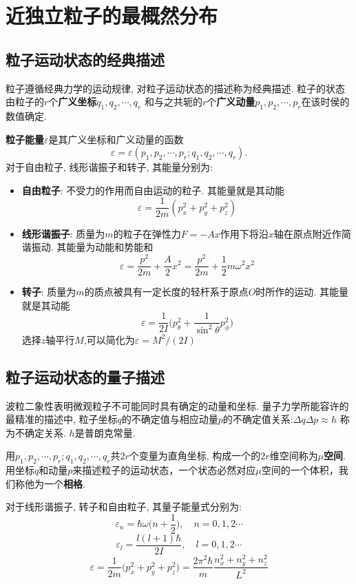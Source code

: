 \section{近独立粒子的最概然分布}


\subsection{粒子运动状态的经典描述}
粒子遵循经典力学的运动规律, 对粒子运动状态的描述称为经典描述. 粒子的状态由粒子的$r$个\textbf{广义坐标}$q_1,q_2,\cdots,q_r$ 和与之共轭的$r$个\textbf{广义动量}$p_1,p_2,\cdots,p_r$在该时侯的数值确定. 

\textbf{粒子能量}$\varepsilon$是其广义坐标和广义动量的函数
\[
\varepsilon = \varepsilon(p_1,p_2,\cdots,p_r; q_1,q_2,\cdots,q_r).
\]
对于自由粒子, 线形谐振子和转子, 其能量分别为:
\begin{itemize}
\item\textbf{自由粒子}: 不受力的作用而自由运动的粒子. 其能量就是其动能
\[
\varepsilon = \frac{1}{2m}(p_x^2 + p_y^2 + p_z^2)
\]
\item\textbf{线形谐振子}: 质量为$m$的粒子在弹性力$F=-Ax$作用下将沿$x$轴在原点附近作简谐振动. 其能量为动能和势能和
\[
\varepsilon = \frac{p^2}{2m} + \frac{A}{2}x^2 = \frac{p^2}{2m} + \frac{1}{2}m\omega^2 x^2
\]
\item\textbf{转子}: 质量为$m$的质点被具有一定长度的轻杆系于原点$O$时所作的运动. 其能量就是其动能
\[
\varepsilon = \frac{1}{2I}\bigg( p_\theta^2 + \frac{1}{\sin^2\theta} p_\phi^2\bigg)
\]
选择$z$轴平行$M$,可以简化为$\varepsilon=M^2/(2I)$
\end{itemize}





\subsection{粒子运动状态的量子描述}
波粒二象性表明微观粒子不可能同时具有确定的动量和坐标. 量子力学所能容许的最精准的描述中, 粒子坐标$q$的不确定值与相应动量$p$的不确定值关系:$\Delta q\Delta p\approx h$ 称为不确定关系. $h$是普朗克常量.

用$p_1,p_2,\cdots,p_r; q_1,q_2,\cdots,q_r$共$2r$个变量为直角坐标, 构成一个的$2r$维空间称为\textbf{$\mu$空间}.
用坐标$q$和动量$p$来描述粒子的运动状态，一个状态必然对应$\mu$空间的一个体积，我们称他为一个\textbf{相格}. 

对于线形谐振子, 转子和自由粒子, 其量子能量式分别为:
\[
\varepsilon_n = \hbar \omega\Big(n+\frac{1}{2}\Big), \quad n = 0,1,2\cdots
\]
\[
\varepsilon_l = \frac{l(l+1)\hbar}{2I}, \quad l = 0,1,2\cdots
\]
\[
\varepsilon = \frac{1}{2m}\big(p_x^2+p_y^2+p_z^2\big) = \frac{2\pi^2\hbar}{m}\frac{n_x^2+n_y^2+n_z^2}{L^2}
\]

